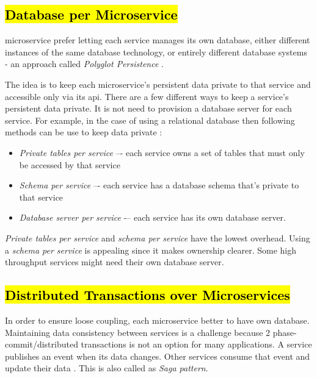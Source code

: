 \subsection{\hl{Database per Microservice}}
\label{subse:database_per_service}

\acrshort{microservice} prefer letting each service manages its own database, either different instances of the same database technology, or entirely different database systems - an approach called \emph{Polyglot Persistence} \cite{LewisMicroservicesManagement}.

The idea is to keep each microservice’s persistent data private to that service and accessible only via its \acrshort{api}. 
There are a few different ways to keep a service's persistent data private. It is not need to provision a database server for each service. For example, in the case of using a relational database then following methods can be use to keep data private \cite{RichardsonMicroservicesService}:
\begin{itemize}
    \item \emph{Private tables per service} –- each service owns a set of tables that must only be accessed by that service
    \item \emph{Schema per service} –- each service has a database schema that’s private to that service
    \item \emph{Database server per service} -– each service has its own database server.
\end{itemize}
\emph{Private tables per service} and \emph{schema per service} have the lowest overhead. Using a \emph{schema per service} is appealing since it makes ownership clearer. Some high throughput services might need their own database server.

\subsection{\hl{Distributed Transactions over Microservices}}
\label{subse:sagas}
In order to ensure loose coupling, each microservice better to have own database. Maintaining data consistency between services is a challenge because 2 phase-commit/distributed transactions is not an option for many applications. A service publishes an event when its data changes. Other services consume that event and update their data \cite{RichardsonMicroservicesSagas}. This is also called as \emph{Saga pattern}.

